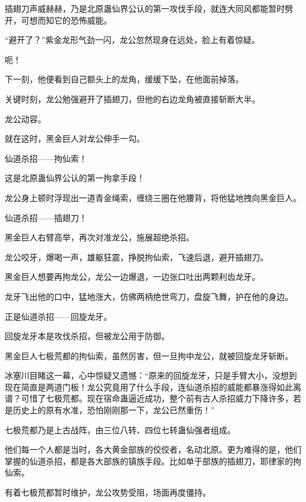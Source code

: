 
\begin{this_body}



插翅刀声威赫赫，乃是北原蛊仙界公认的第一攻伐手段，就连大同风都能暂时劈开，可想而知它的恐怖威能。

“避开了？”紫金龙形气劲一闪，龙公忽然现身在远处，脸上有着惊疑。

呃！

下一刻，他便看到自己额头上的龙角，缓缓下坠，在他面前掉落。

关键时刻，龙公勉强避开了插翅刀，但他的右边龙角被直接斩断大半。

龙公动容。

就在这时，黑金巨人对龙公伸手一勾。

仙道杀招——拘仙索！

这是北原蛊仙界公认的第一拘拿手段！

龙公身上顿时浮现出一道青金绳索，缠绕三圈在他腰背，将他猛地拽向黑金巨人。

仙道杀招——插翅刀！

黑金巨人右臂高举，再次对准龙公，施展超绝杀招。

龙公咬牙，爆喝一声，雄躯狂震，挣脱拘仙索，飞速后退，避开插翅刀。

黑金巨人想要再拘龙公，龙公一边爆退，一边张口吐出两颗利齿龙牙。

龙牙飞出他的口中，猛地涨大，仿佛两柄绝世弯刀，盘旋飞舞，护在他的身边。

正是仙道杀招——回旋龙牙。

回旋龙牙本是攻伐杀招，但被龙公用于防御。

黑金巨人七极荒都的拘仙索，虽然厉害，但一旦拘中龙公，就被回旋龙牙斩断。

冰塞川目睹这一幕，心中惊疑又遗憾：“原来的回旋龙牙，只是手臂大小，没想到现在简直是两道门板！龙公究竟用了什么手段，连仙道杀招的威能都暴涨得如此离谱？可惜了七极荒都。现在宿命蛊逼近成功，整个前有古人杀招威力下降许多，若是历史上的原有水准，恐怕刚刚那一下，龙公已然重伤！”

七极荒都乃是上古战阵，由三位八转、四位七转蛊仙强者组成。

他们每一个人都是当时，各大黄金部族的佼佼者，名动北原。更为难得的是，他们掌握的仙道杀招，都是各大部族的镇族手段。比如单于部族的插翅刀，耶律家的拘仙索。

有着七极荒都暂时维护，龙公攻势受阻，场面再度僵持。


\end{this_body}
